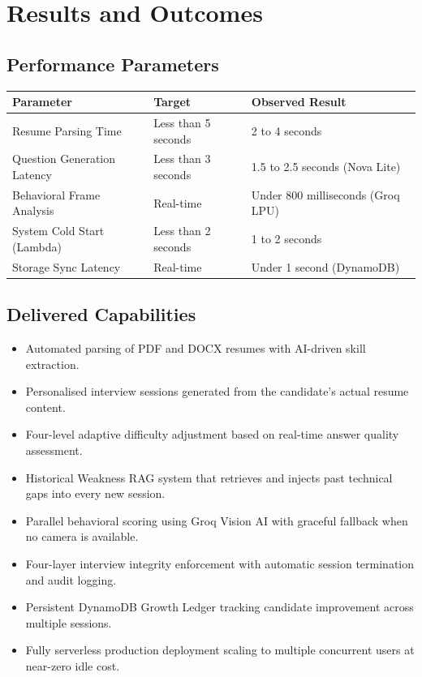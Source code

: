 \documentclass[12pt,a4paper]{article}
\begin{document}
\newpage

\section{Results and Outcomes}

\subsection{Performance Parameters}

\begin{longtable}{|p{5cm}|p{4cm}|p{4cm}|}
\hline
\textbf{Parameter} & \textbf{Target} & \textbf{Observed Result} \\
\hline
Resume Parsing Time & Less than 5 seconds & 2 to 4 seconds \\
\hline
Question Generation Latency & Less than 3 seconds & 1.5 to 2.5 seconds (Nova Lite) \\
\hline
Behavioral Frame Analysis & Real-time & Under 800 milliseconds (Groq LPU) \\
\hline
System Cold Start (Lambda) & Less than 2 seconds & 1 to 2 seconds \\
\hline
Storage Sync Latency & Real-time & Under 1 second (DynamoDB) \\
\hline
\end{longtable}

\subsection{Delivered Capabilities}

\begin{itemize}[leftmargin=*]
    \item Automated parsing of PDF and DOCX resumes with AI-driven skill extraction.
    \item Personalised interview sessions generated from the candidate's actual resume content.
    \item Four-level adaptive difficulty adjustment based on real-time answer quality assessment.
    \item Historical Weakness RAG system that retrieves and injects past technical gaps into every new session.
    \item Parallel behavioral scoring using Groq Vision AI with graceful fallback when no camera is available.
    \item Four-layer interview integrity enforcement with automatic session termination and audit logging.
    \item Persistent DynamoDB Growth Ledger tracking candidate improvement across multiple sessions.
    \item Fully serverless production deployment scaling to multiple concurrent users at near-zero idle cost.
\end{itemize}
\end{document}
